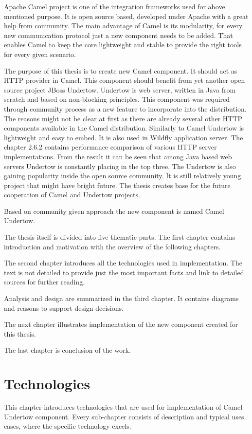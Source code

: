 \documentclass[12pt,final,oneside]{fithesis2}
\begin{document}
Apache Camel project is one of the integration frameworks used for above mentioned purpose. It is open source based, developed under Apache with a great help from community. The main advantage of Camel is its modularity, for every new communication protocol just a new component needs to be added. That enables Camel to keep the core lightweight and stable to provide the right tools for every given scenario.

 The purpose of this thesis is to create new Camel  component. It should act as HTTP provider in Camel. This component should benefit from yet another open source project JBoss Undertow. Undertow is web server, written in Java from scratch and based on non-blocking principles. This component was required through community process as a new feature to incorporate into the distribution. The reasons might not be clear at first as there are already several other HTTP components available in the Camel distribution. Similarly to Camel Undertow is lightweight and easy to embed. It is also used in Wildfly application server. The chapter 2.6.2 contains performance comparison of various HTTP server implementations. From the result it can be seen that among Java based web servers Undertow is constantly placing in the top three. The Undertow is also gaining popularity inside the open source community. It is still relatively young project that might have bright future. The thesis creates base for the future cooperation of Camel and Undertow projects.   
 
Based on community given approach the new component is named Camel Undertow.   
 
 The thesis itself is divided into five thematic parts. The first chapter contains introduction and motivation with the overview of the following chapters.
 
 The second chapter introduces all the technologies used in implementation. The text is not detailed to provide just the most important facts and link to detailed sources for further reading.

Analysis and design are summarized in the third chapter. It contains diagrams and reasons to support design decisions.

The next chapter illustrates implementation of the new component created for this thesis.

The last chapter is conclusion of the work.

\chapter{Technologies}
This chapter introduces technologies that are used for implementation of Camel Undertow component. Every sub-chapter consists of description and typical uses cases, where the specific technology excels.
\end{document}
